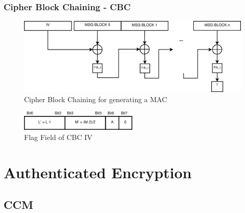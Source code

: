 \subsubsection{Cipher Block Chaining - CBC}\label{cbcAuth}


\begin{figure}\label{cbcMAC}
    \centering
    \includegraphics[width=1\textwidth]{figures/CBCMac.eps}
    \caption{Cipher Block Chaining for generating a MAC}
    \label{fig:cbc_MAC}
\end{figure}

\begin{figure}\label{cbcMACFlags}
    \centering
    \includegraphics[width=0.5\textwidth]{figures/CBCIVFlags.eps}
    \caption{Flag Field of CBC IV}
    \label{fig:cbc_Flags}
\end{figure}

\section{Authenticated Encryption}\label{authEncrypt}

\subsection{CCM}

